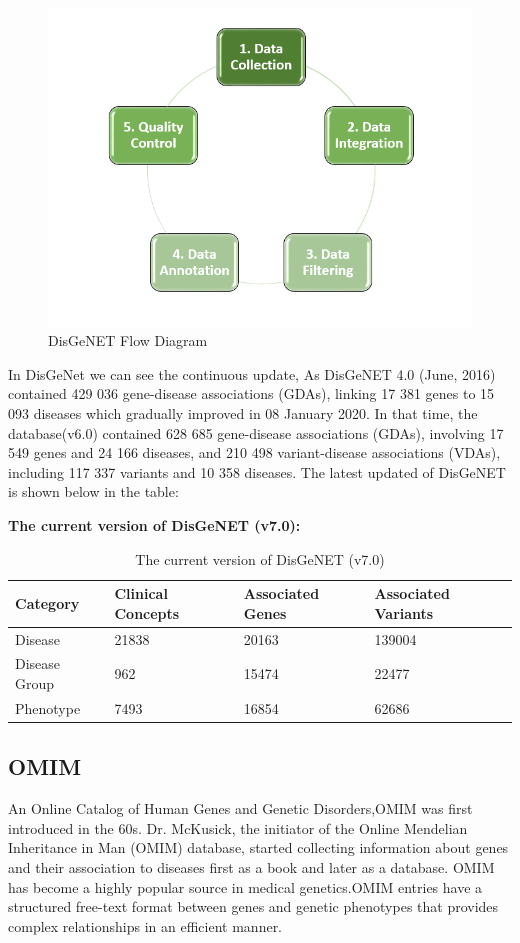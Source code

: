 \begin{figure}[!h]
    \centering
    \includegraphics[width=0.75\linewidth]{DisGeNET Flow.PNG}
    \caption{DisGeNET Flow Diagram}
    \label{fig:DisGeNETl}
\end{figure}

In DisGeNet we can see the continuous update, As DisGeNET 4.0 (June, 2016)\cite{27} contained 429 036 gene-disease associations (GDAs), linking 17 381 genes to 15 093 diseases which gradually improved in 08 January 2020. In that time, the database(v6.0)\cite{28} contained 628 685 gene-disease associations (GDAs), involving 17 549 genes and 24 166 diseases, and 210 498 variant-disease associations (VDAs), including 117 337 variants and 10 358 diseases. The latest updated of DisGeNET is shown below in the table:

\textbf{The current version of DisGeNET (v7.0):}
\begin{table}
	\centering
	\begin{tabularx}{\textwidth}{|X|X|X|X|}
		\hline
		\textbf{Category} & \textbf{Clinical Concepts} & \textbf{Associated Genes} & \textbf{Associated Variants} \\
		\hline
		Disease & 21838 & 20163 & 139004 \\
		Disease Group & 962 & 15474 & 22477 \\
		Phenotype & 7493 & 16854 & 62686 \\
		\hline
	\end{tabularx}
	\caption{The current version of DisGeNET (v7.0)}
\end{table}

 

\subsection{OMIM}
{An Online Catalog of Human Genes and Genetic Disorders,OMIM was first introduced in the 60s. Dr. McKusick, the initiator of the Online Mendelian Inheritance in Man (OMIM)\cite{29} database, started collecting information about genes and their association to diseases first as a book and later as a database. OMIM has become a highly popular source in medical genetics.OMIM entries have a structured free-text format between genes and genetic phenotypes that provides complex relationships in an efficient manner.\cite{30}}


